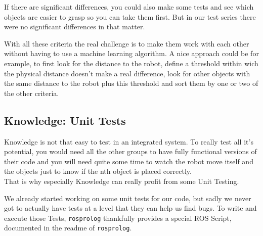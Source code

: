 \documentclass[main.tex]{subfiles}
\begin{document}
		If there are significant differences, you could also make some tests and see which objects are easier to grasp so you can take them first. But in our test series there were no significant differences in that matter. 
		
		With all these criteria the real challenge is to make them work with each other without having to use a machine learning algorithm. A nice approach could be for example, to first look for the distance to the robot, define a threshold within wich the physical distance doesn't make a real difference, look for other objects with the same distance to the robot plus this threshold and sort them by one or two of the other criteria. 
		
		\subsection{Knowledge: Unit Tests}
		Knowledge is not that easy to test in an integrated system. To really test all it's potential, you would need all the other groups to have fully functional versions of their code and you will need quite some time to watch the robot move itself and the objects just to know if the nth object is placed correctly.\\
		That is why especially Knowledge can really profit from some Unit Testing.
		
		We already started working on some unit tests for our code, but sadly we never got to actually have tests at a level that they can help us find bugs. To write and execute those Tests, \texttt{rosprolog} thankfully provides a special ROS Script, documented in the readme of \texttt{rosprolog}.


		
		
		
		
		
	\endgroup
\end{document}
